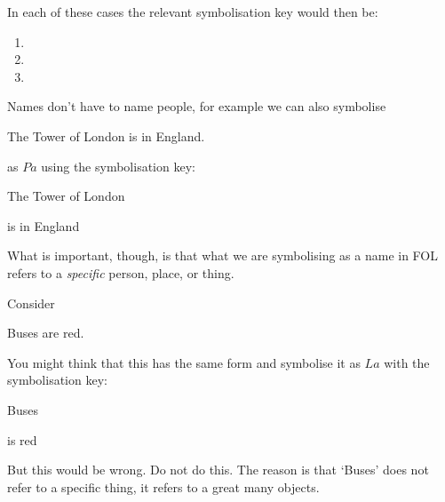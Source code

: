 In each of these cases the relevant symbolisation key would then be:
\begin{enumerate}
\item[\ref{sent:folrocky}] 
\item[\ref{sent:folbiden}] 
\item[\ref{sent:folpalin}] 
\end{enumerate}
Names don't have to name people, for example we can also symbolise
\begin{samplesent}
\item\label{sent:foltower} The Tower of London is in England.
\end{samplesent}
as $Pa$ using the symbolisation key:
\begin{ekey}
\item[a] The Tower of London
\item[Px]  is in England
\end{ekey}
What is important, though, is that what we are symbolising as a name in FOL refers to a \emph{specific} person, place, or thing.

Consider
\begin{samplesent}
\item\label{sent:folbuses} Buses are red.
\end{samplesent}
You might think that this has the same form and symbolise it as $La$ with the symbolisation key:
\begin{ekey}
\item[a] Buses
\item[Lx]  is red
\end{ekey}
But this would be wrong. Do not do this. The reason  is that `Buses' does not refer to a specific thing, it refers to a great many objects.

